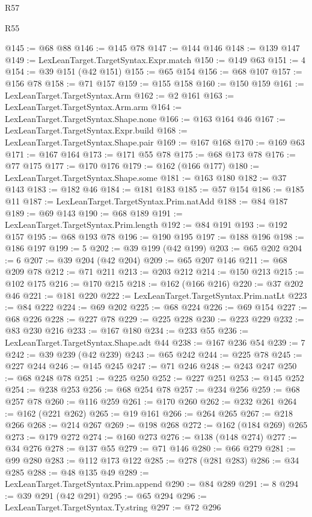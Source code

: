 \begin{lexlean}{R57}
\begin{lexlean}{R55}
\begin{coremodule}
{{{{{{{{{{{{{{{{{{{{{{{{{{{{{{{{{{{{{{{{{{{{{{{{{{{{{{{{{{{{@145 := @68 @88
@146 := @145 @78
@147 := @144 @146
@148 := @139 @147
@149 := LexLeanTarget.TargetSyntax.Expr.match
@150 := @149 @63
@151 := 4
@154 := @39 @151 (@42 @151)
@155 := @65 @154
@156 := @68 @107
@157 := @156 @78
@158 := @71 @157
@159 := @155 @158
@160 := @150 @159
@161 := LexLeanTarget.TargetSyntax.Arm
@162 := @2 @161
@163 := LexLeanTarget.TargetSyntax.Arm.arm
@164 := LexLeanTarget.TargetSyntax.Shape.none
@166 := @163 @164 @46
@167 := LexLeanTarget.TargetSyntax.Expr.build
@168 := LexLeanTarget.TargetSyntax.Shape.pair
@169 := @167 @168
@170 := @169 @63
@171 := @167 @164
@173 := @171 @55 @78
@175 := @68 @173 @78
@176 := @77 @175
@177 := @170 @176
@179 := @162 (@166 @177)
@180 := LexLeanTarget.TargetSyntax.Shape.some
@181 := @163 @180
@182 := @37 @143
@183 := @182 @46
@184 := @181 @183
@185 := @57 @154
@186 := @185 @11
@187 := LexLeanTarget.TargetSyntax.Prim.natAdd
@188 := @84 @187
@189 := @69 @143
@190 := @68 @189
@191 := LexLeanTarget.TargetSyntax.Prim.length
@192 := @84 @191
@193 := @192 @157
@195 := @68 @193 @78
@196 := @190 @195
@197 := @188 @196
@198 := @186 @197
@199 := 5
@202 := @39 @199 (@42 @199)
@203 := @65 @202
@204 := 6
@207 := @39 @204 (@42 @204)
@209 := @65 @207 @146
@211 := @68 @209 @78
@212 := @71 @211
@213 := @203 @212
@214 := @150 @213
@215 := @102 @175
@216 := @170 @215
@218 := @162 (@166 @216)
@220 := @37 @202 @46
@221 := @181 @220
@222 := LexLeanTarget.TargetSyntax.Prim.natLt
@223 := @84 @222
@224 := @69 @202
@225 := @68 @224
@226 := @69 @154
@227 := @68 @226
@228 := @227 @78
@229 := @225 @228
@230 := @223 @229
@232 := @83 @230 @216
@233 := @167 @180
@234 := @233 @55
@236 := LexLeanTarget.TargetSyntax.Shape.adt @44
@238 := @167 @236 @54
@239 := 7
@242 := @39 @239 (@42 @239)
@243 := @65 @242
@244 := @225 @78
@245 := @227 @244
@246 := @145 @245
@247 := @71 @246
@248 := @243 @247
@250 := @68 @248 @78
@251 := @225 @250
@252 := @227 @251
@253 := @145 @252
@254 := @238 @253
@256 := @68 @254 @78
@257 := @234 @256
@259 := @68 @257 @78
@260 := @116 @259
@261 := @170 @260
@262 := @232 @261
@264 := @162 (@221 @262)
@265 := @19 @161
@266 := @264 @265
@267 := @218 @266
@268 := @214 @267
@269 := @198 @268
@272 := @162 (@184 @269) @265
@273 := @179 @272
@274 := @160 @273
@276 := @138 (@148 @274)
@277 := @34 @276
@278 := @137 @55
@279 := @71 @146
@280 := @66 @279
@281 := @99 @280
@283 := @112 @173 @122
@285 := @278 (@281 @283)
@286 := @34 @285
@288 := @48 @135 @49
@289 := LexLeanTarget.TargetSyntax.Prim.append
@290 := @84 @289
@291 := 8
@294 := @39 @291 (@42 @291)
@295 := @65 @294
@296 := LexLeanTarget.TargetSyntax.Ty.string
@297 := @72 @296
}}}}}}}}}}}}}}}}}}}}}}}}}}}}}}}}}}}}}}}}}}}}}}}}}}}}}}}}}}}}
\end{coremodule}
\end{lexlean}
\end{lexlean}
